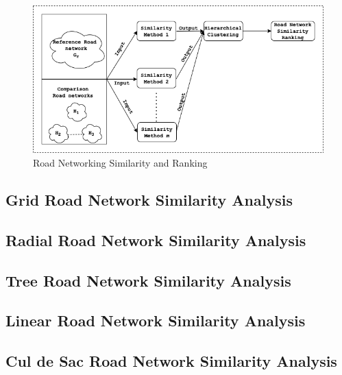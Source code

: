 \begin{figure}[h]
\centering
\includegraphics[width=1.25\textwidth,center]{picture/network_ranking.png}
\caption[Miniaturtrichter]{Road Networking Similarity and Ranking}
\label{fig:network ranking}
\end{figure}

\subsection{Grid Road Network Similarity Analysis}
\subsection{Radial Road Network Similarity Analysis}
\subsection{Tree Road Network Similarity Analysis}
\subsection{Linear Road Network Similarity Analysis}
\subsection{Cul de Sac Road Network Similarity Analysis}
